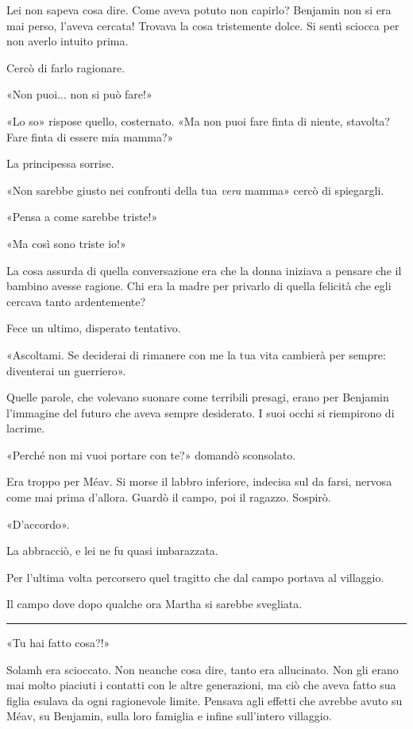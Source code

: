 \documentclass[a4paper,11pt,oneside,openright,final]{memoir}
\begin{document}
Lei non sapeva cosa dire. Come aveva potuto non capirlo? Benjamin non si era mai
perso, l'aveva cercata! Trovava la cosa tristemente dolce. Si sentì sciocca per
non averlo intuito prima.

Cercò di farlo ragionare.

«Non puoi... non si può fare!»

«Lo so» rispose quello, costernato. «Ma non puoi fare finta di niente,
stavolta? Fare finta di essere mia mamma?»

La principessa sorrise.

«Non sarebbe giusto nei confronti della tua \emph{vera} mamma» cercò di
spiegargli.

«Pensa a come sarebbe triste!»

«Ma così sono triste io!»

La cosa assurda di quella conversazione era che la donna iniziava a pensare che
il bambino avesse ragione. Chi era la madre per privarlo di quella felicità che
egli cercava tanto ardentemente?

Fece un ultimo, disperato tentativo.

«Ascoltami. Se deciderai di rimanere con me la tua vita cambierà per sempre:
diventerai un guerriero».

Quelle parole, che volevano suonare come terribili presagi, erano per Benjamin
l'immagine del futuro che aveva sempre desiderato. I suoi occhi si riempirono di
lacrime.

«Perché non mi vuoi portare con te?» domandò sconsolato.

Era troppo per Méav. Si morse il labbro inferiore, indecisa sul da farsi,
nervosa come mai prima d'allora. Guardò il campo, poi il ragazzo. Sospirò.

«D'accordo».

La abbracciò, e lei ne fu quasi imbarazzata.

Per l'ultima volta percorsero quel tragitto che dal campo portava al villaggio.

Il campo dove dopo qualche ora Martha si sarebbe svegliata.

\plainbreak{1}

«Tu hai fatto cosa?!»

Solamh era scioccato. Non neanche cosa dire, tanto era allucinato. Non gli erano
mai molto piaciuti i contatti con le altre generazioni, ma ciò che aveva fatto
sua figlia esulava da ogni ragionevole limite. Pensava agli effetti che avrebbe
avuto su Méav, su Benjamin, sulla loro famiglia e infine sull'intero villaggio.
\end{document}
